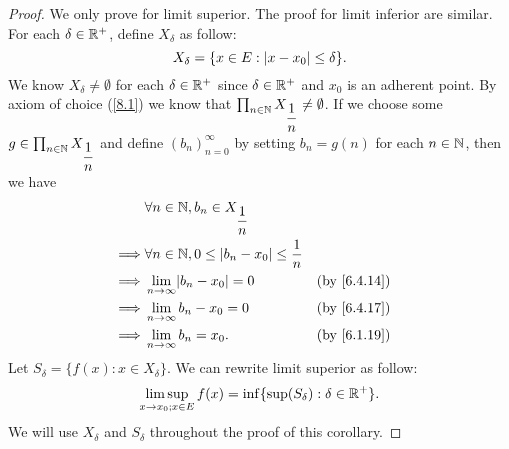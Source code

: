 \begin{proof}
  We only prove for limit superior.
  The proof for limit inferior are similar.
  For each \(\delta \in \mathbb{R}^+\), define \(X_{\delta}\) as follow:
  \[
    X_{\delta} = \{x \in E : \left\lvert x - x_0\right\rvert \leq \delta\}.
  \]
  We know \(X_{\delta} \neq \emptyset\) for each \(\delta \in \mathbb{R}^+\) since \(\delta \in \mathbb{R}^+\) and \(x_0\) is an adherent point.
  By axiom of choice (\cref{8.1}) we know that \(\prod_{n \in \mathbb{N}} X_{\dfrac{1}{n}} \neq \emptyset\).
  If we choose some \(g \in \prod_{n \in \mathbb{N}} X_{\dfrac{1}{n}}\) and define \((b_n)_{n = 0}^\infty\) by setting \(b_n = g(n)\) for each \(n \in \mathbb{N}\), then we have
  \begin{align*}
             & \forall n \in \N, b_n \in X_{\dfrac{1}{n}}                                                \\
    \implies & \forall n \in \N, 0 \leq \abs{b_n - x_0} \leq \dfrac{1}{n}                                \\
    \implies & \lim_{n \to \infty} \abs{b_n - x_0} = 0                    &  & \text{(by \cref{6.4.14})} \\
    \implies & \lim_{n \to \infty} b_n - x_0 = 0                          &  & \text{(by \cref{6.4.17})} \\
    \implies & \lim_{n \to \infty} b_n = x_0.                             &  & \text{(by \cref{6.1.19})}
  \end{align*}
  Let \(S_{\delta} = \{f(x) : x \in X_{\delta}\}\).
  We can rewrite limit superior as follow:
  \[
    \limsup_{x \to x_0 ; x \in E} f(x) = \inf\{\sup(S_\delta) : \delta \in \mathbb{R}^+\}.
  \]
  We will use \(X_{\delta}\) and \(S_{\delta}\) throughout the proof of this corollary.


\end{proof}
